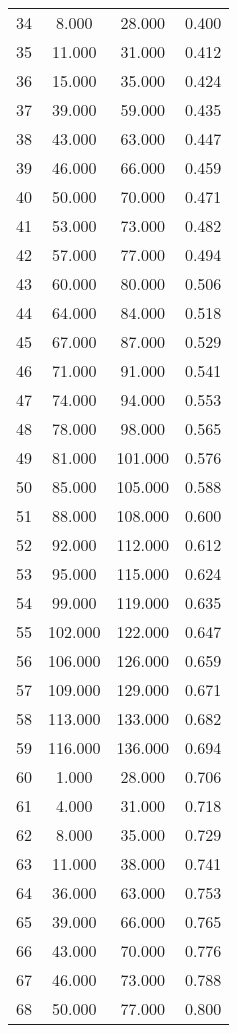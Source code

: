 \begin{tabular}{cccc}
  34 & 8.000 & 28.000 & 0.400 \\ 
  35 & 11.000 & 31.000 & 0.412 \\ 
  36 & 15.000 & 35.000 & 0.424 \\ 
  37 & 39.000 & 59.000 & 0.435 \\ 
  38 & 43.000 & 63.000 & 0.447 \\ 
  39 & 46.000 & 66.000 & 0.459 \\ 
  40 & 50.000 & 70.000 & 0.471 \\ 
  41 & 53.000 & 73.000 & 0.482 \\ 
  42 & 57.000 & 77.000 & 0.494 \\ 
  43 & 60.000 & 80.000 & 0.506 \\ 
  44 & 64.000 & 84.000 & 0.518 \\ 
  45 & 67.000 & 87.000 & 0.529 \\ 
  46 & 71.000 & 91.000 & 0.541 \\ 
  47 & 74.000 & 94.000 & 0.553 \\ 
  48 & 78.000 & 98.000 & 0.565 \\ 
  49 & 81.000 & 101.000 & 0.576 \\ 
  50 & 85.000 & 105.000 & 0.588 \\ 
  51 & 88.000 & 108.000 & 0.600 \\ 
  52 & 92.000 & 112.000 & 0.612 \\ 
  53 & 95.000 & 115.000 & 0.624 \\ 
  54 & 99.000 & 119.000 & 0.635 \\ 
  55 & 102.000 & 122.000 & 0.647 \\ 
  56 & 106.000 & 126.000 & 0.659 \\ 
  57 & 109.000 & 129.000 & 0.671 \\ 
  58 & 113.000 & 133.000 & 0.682 \\ 
  59 & 116.000 & 136.000 & 0.694 \\ 
  60 & 1.000 & 28.000 & 0.706 \\ 
  61 & 4.000 & 31.000 & 0.718 \\ 
  62 & 8.000 & 35.000 & 0.729 \\ 
  63 & 11.000 & 38.000 & 0.741 \\ 
  64 & 36.000 & 63.000 & 0.753 \\ 
  65 & 39.000 & 66.000 & 0.765 \\ 
  66 & 43.000 & 70.000 & 0.776 \\ 
  67 & 46.000 & 73.000 & 0.788 \\ 
  68 & 50.000 & 77.000 & 0.800 \\ 

\end{tabular}
